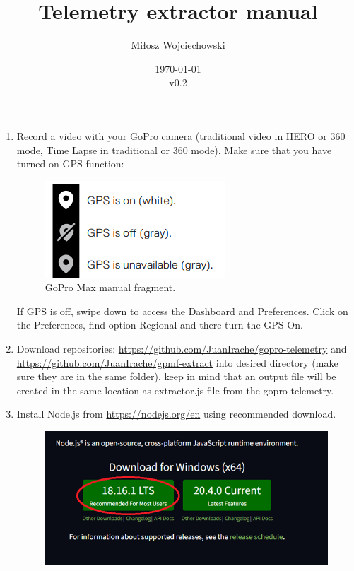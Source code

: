 \documentclass[a4paper,12pt]{article}
\begin{document}
\author{Miłosz Wojciechowski}
\title{Telemetry extractor manual}
\date{\today\\ v0.2}


\maketitle
\pagebreak
{}
\renewcommand{\labelenumii}{\arabic{enumi}.\arabic{enumii}}

\begin{enumerate}
	\item Record a video with your GoPro camera (traditional video in HERO or 360 mode, Time Lapse in traditional or 360 mode). Make sure that you have turned on GPS function:
\begin{figure}[H]
	\centering
	\includegraphics{GoPro_manual_fragment}
	\caption{GoPro Max manual fragment.}
\end{figure}
	If GPS is off, swipe down to access the Dashboard and Preferences. Click on the Preferences, find option Regional and there turn the GPS On.\\
	\item Download repositories: \url{https://github.com/JuanIrache/gopro-telemetry} and \url{https://github.com/JuanIrache/gpmf-extract} into desired directory (make sure they are in the same folder), keep in mind that an output file will be created in the same location as extractor.js file from the gopro-telemetry.
	\item Install Node.js from \url{https://nodejs.org/en} using recommended download.
	\begin{figure}[H]
		\centering
		\includegraphics{nodejs_install}

\end{figure}
\end{enumerate}
\end{document}
